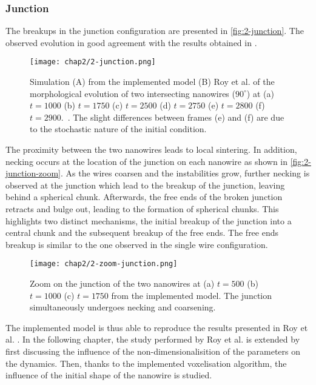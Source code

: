    \subsubsection{Junction}
    The breakups in the junction configuration are presented in \autoref{fig:2-junction}. The observed evolution in good agreement with the results obtained in \cite{RoyVarmaGururajan2021}. 
    \begin{figure}
        \centering
        \texttt{[image: chap2/2-junction.png]}
        \caption{Simulation (A) from the implemented model (B) Roy et al. of the morphological evolution of two intersecting nanowires ($90^\circ$) at (a) $t=1000$ (b) $t=1750$ (c) $t=2500$ (d) $t=2750$ (e) $t=2800$ (f) $t=2900$.\ \cite{RoyVarmaGururajan2021}. The slight differences between frames (e) and (f) are due to the stochastic nature of the initial condition.}
        \label{fig:2-junction}
    \end{figure}
    The proximity between the two nanowires leads to local sintering. In addition, necking occurs at the location of the junction on each nanowire as shown in \autoref{fig:2-junction-zoom}. As the wires coarsen and the instabilities grow, further necking is observed at the junction which lead to the breakup of the junction, leaving behind a spherical chunk. Afterwards, the free ends of the broken junction retracts and bulge out, leading to the formation of spherical chunks. This highlights two distinct mechanisms, the initial breakup of the junction into a central chunk and the subsequent breakup of the free ends. The free ends breakup is similar to the one observed in the single wire configuration.
    \begin{figure}[H]
        \centering
        \texttt{[image: chap2/2-zoom-junction.png]}
        \caption{Zoom on the junction of the two nanowires at (a) $t=500$ (b) $t=1000$ (c) $t=1750$ from the implemented model. The junction simultaneously undergoes necking and coarsening. }
        \label{fig:2-junction-zoom}
    \end{figure}
    The implemented model is thus able to reproduce the results presented in Roy et al. \cite{RoyVarmaGururajan2021}. In the following chapter, the study performed by Roy et al. is extended by first discussing the influence of the non-dimensionalisition of the parameters on the dynamics. Then, thanks to the implemented voxelisation algorithm, the influence of the initial shape of the nanowire is studied.
